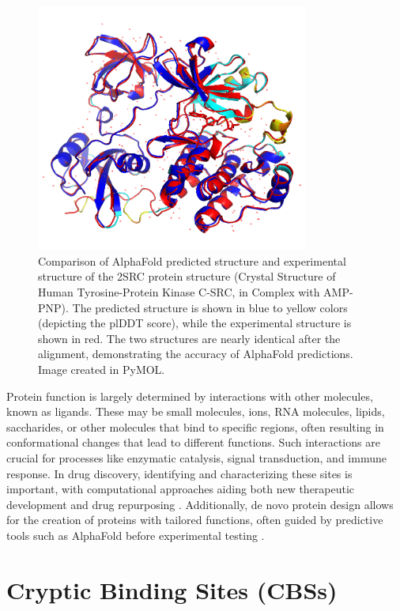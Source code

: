 \begin{figure}[ht]
    \centering
    \includegraphics[width=0.8\textwidth]{img/alphafold_vs_exp.png}
    \caption{Comparison of AlphaFold predicted structure and experimental structure of the 2SRC protein structure (Crystal Structure of Human Tyro\-sine-Protein Kinase C-SRC, in Complex with AMP-PNP). The predicted structure is shown in blue to yellow colors (depicting the plDDT score), while the experimental structure is shown in red. The two structures are nearly identical after the alignment, demonstrating the accuracy of AlphaFold predictions. Image created in PyMOL.}
    \label{fig:alphafold-vs-exp}
\end{figure}
\par

Protein function is largely determined by interactions with other molecules, known as ligands. These may be small molecules, ions, RNA molecules, lipids, saccharides, or other molecules that bind to specific regions, often resulting in conformational changes that lead to different functions. Such interactions are crucial for processes like enzymatic catalysis, signal transduction, and immune response. In drug discovery, identifying and characterizing these sites is important, with computational approaches aiding both new therapeutic development and drug repurposing \cite{konc2019binding}. Additionally, de novo protein design allows for the creation of proteins with tailored functions, often guided by predictive tools such as AlphaFold before experimental testing \cite{huang2016coming}.

\section{Cryptic Binding Sites (CBSs)}
\label{sec:binding-sites}


